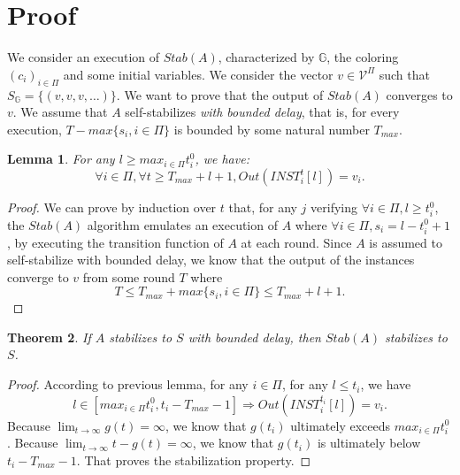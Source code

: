 \documentclass[11pt,letterpaper]{article}
\newtheorem{thm}{Theorem}
\newtheorem{lem}[thm]{Lemma}
\begin{document}
\section{Proof}

We consider an execution of $Stab(A)$, characterized by $\mathds{G}$, the coloring $(c_i)_{i \in \Pi}$ and some initial variables.
We consider the vector $v \in \mathcal{V}^\Pi$ such that $S_\mathds{G} = \{(v, v, v, \dots)\}$.
We want to prove that the output of $Stab(A)$ converges to $v$.
We assume that $A$ self-stabilizes \textit{with bounded delay}, that is, for every execution,
$T-max\{s_i, i \in \Pi\}$ is bounded by some natural number $T_{max}$.

\begin{lem}
	For any $l \geq max_{i \in \Pi} t_i^0$, we have:
	$$\forall i \in \Pi, \forall t \geq T_{max}+l+1, Out(INST_i^t[l]) = v_i.$$
\end{lem}
\begin{proof}
	We can prove by induction over $t$ that, for any $j$ verifying $\forall i \in \Pi, l \geq t_i^0$,
	the $Stab(A)$ algorithm emulates an execution of $A$ where $\forall i \in \Pi, s_i = l-t_i^0+1$,
	by executing the transition function of $A$ at each round.
	Since $A$ is assumed to self-stabilize with bounded delay, we know that the output of the instances converge to $v$ from some round $T$ where
	$$T \leq T_{max} + max\{s_i, i \in \Pi\} \leq T_{max} + l + 1.$$
\end{proof}

\begin{thm}
	If $A$ stabilizes to $S$ with bounded delay, then $Stab(A)$ stabilizes to $S$.
\end{thm}
\begin{proof}
	According to previous lemma, for any $i \in \Pi$, for any $l \leq t_i$, we have
	$$l \in [max_{i \in \Pi} t_i^0, t_i-T_{max}-1] \Rightarrow Out(INST_i^{t_i}[l]) = v_i.$$
	Because $\lim_{t \rightarrow \infty} g(t) = \infty$, we know that $g(t_i)$ ultimately exceeds $max_{i \in \Pi} t_i^0$.
	Because $\lim_{t \rightarrow \infty} t-g(t) = \infty$, we know that $g(t_i)$ is ultimately below $t_i-T_{max}-1$.
	That proves the stabilization property.
\end{proof}
\end{document}
